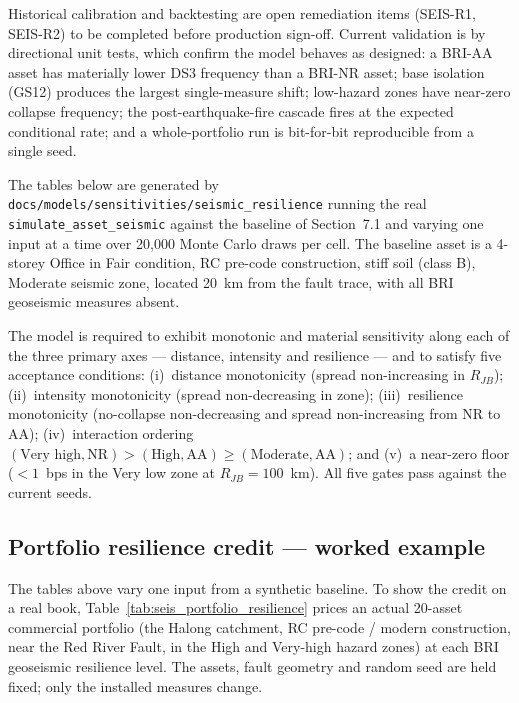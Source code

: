 \documentclass[11pt,a4paper]{article}
\begin{document}
Historical calibration and backtesting are open remediation items (SEIS-R1,
SEIS-R2) to be completed before production sign-off. Current validation is by
directional unit tests, which confirm the model behaves as designed: a BRI-AA
asset has materially lower DS3 frequency than a BRI-NR asset; base isolation
(GS12) produces the largest single-measure shift; low-hazard zones have
near-zero collapse frequency; the post-earthquake-fire cascade fires at the
expected conditional rate; and a whole-portfolio run is bit-for-bit reproducible
from a single seed.

\mkmtestresults

\mkmsensitivity
\label{sec:sensitivity}

The tables below are generated by
\texttt{docs/models/sensitivities/seismic\_resilience} running the real
\texttt{simulate\_asset\_seismic} against the baseline of Section~7.1 and varying
one input at a time over 20{,}000 Monte Carlo draws per cell. The baseline asset
is a 4-storey Office in Fair condition, RC pre-code construction, stiff soil
(class B), Moderate seismic zone, located 20~km from the fault trace, with all
BRI geoseismic measures absent.

The model is required to exhibit monotonic and material sensitivity along each of
the three primary axes --- distance, intensity and resilience --- and to satisfy
five acceptance conditions: (i)~distance monotonicity (spread non-increasing in
$R_{JB}$); (ii)~intensity monotonicity (spread non-decreasing in zone);
(iii)~resilience monotonicity (no-collapse non-decreasing and spread
non-increasing from NR to AA); (iv)~interaction ordering
$(\text{Very high}, \text{NR}) > (\text{High}, \text{AA}) \ge (\text{Moderate},
\text{AA})$; and (v)~a near-zero floor ($< 1$~bps in the Very low zone at
$R_{JB} = 100$~km). All five gates pass against the current seeds.



\subsection{Portfolio resilience credit --- worked example}
\label{sec:portfolio_resilience}

The tables above vary one input from a synthetic baseline. To show the credit on
a real book, Table~\ref{tab:seis_portfolio_resilience} prices an actual 20-asset
commercial portfolio (the Halong catchment, RC pre-code / modern construction,
near the Red River Fault, in the High and Very-high hazard zones) at each BRI
geoseismic resilience level. The assets, fault geometry and random seed are held
fixed; only the installed measures change.
\end{document}
